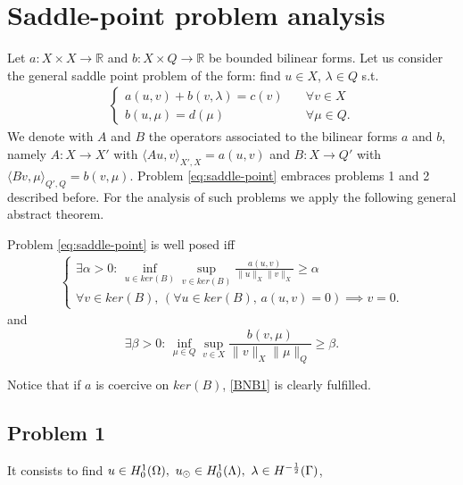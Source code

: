 \section{Saddle-point problem analysis}
Let $a: X \times X \rightarrow \mathbb{R}$ and $b: X\times Q \rightarrow \mathbb{R}$ be bounded bilinear forms. Let us consider the general saddle point problem of the form: find $u\in X$, $\lambda\in Q$ s.t.
\begin{eqnarray}\label{eq:saddle-point}
\begin{cases}
a(u,v)+b(v,\lambda)=c(v)\quad &\forall v\in X\\
b(u,\mu)=d(\mu) \quad &\forall \mu\in Q.
\end{cases}
\end{eqnarray}
We denote with $A$ and $B$ the operators associated to the bilinear forms $a$ and $b$, 
namely $A: X \longrightarrow X'$ with $\langle Au,v\rangle _{X',X} = a(u,v)$ and $B: X \longrightarrow Q'$ with $\langle Bv,\mu\rangle_{Q',Q} = b(v,\mu)$. Problem \eqref{eq:saddle-point} embraces problems 1 and 2 described before. For the analysis of such problems we apply the following general abstract theorem.
\begin{theorem}{\cite[Theorem 2.34]{MR2050138}}\label{th:bnb}
Problem \eqref{eq:saddle-point} is well posed iff 
\begin{eqnarray}\label{BNB1}
\begin{cases}
\exists \alpha >0 :\, \inf_{u\in ker(B)}\sup_{v\in ker(B)} \frac{a(u,v)}{\|u\|_{X}\|v\|_{X}}\geq \alpha\\
\forall v \in ker(B), \, \left( \forall u \in ker(B),\, a(u,v)=0 \right)\implies v=0.
\end{cases}
\end{eqnarray}
and 
\begin{equation}\label{eq:infsup}
\exists \beta >0:\,\inf_{\mu\in Q}\sup_{v\in X} \frac{b(v,\mu)}{\|v\|_{X}\|\mu\|_{Q}}\geq \beta .
\end{equation}
\end{theorem} 
Notice that if $a$ is coercive on $ker(B)$, \eqref{BNB1} is clearly fulfilled. \\

\subsection{Problem 1}
It consists to find $u \in H^1_0(\Omega),\ \ud \in H_0^1(\Lambda), \ \lambda \in H^{-\frac12}(\Gamma )$, %

